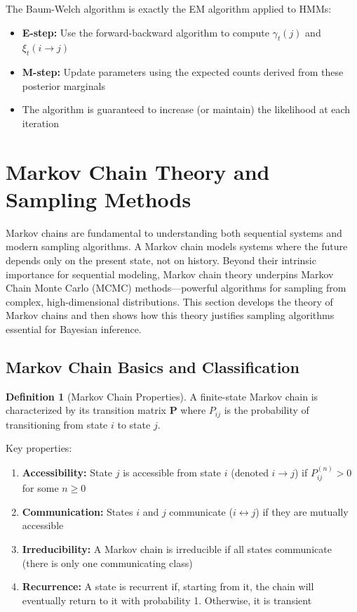 \documentclass[12pt,a4paper]{article}
\theoremstyle{definition}
\newtheorem{definition}{Definition}[section]
\begin{document}
The Baum-Welch algorithm is exactly the EM algorithm applied to HMMs:
\begin{itemize}
    \item \textbf{E-step:} Use the forward-backward algorithm to compute $\gamma_t(j)$ and $\xi_t(i \to j)$
    \item \textbf{M-step:} Update parameters using the expected counts derived from these posterior marginals
    \item The algorithm is guaranteed to increase (or maintain) the likelihood at each iteration
\end{itemize}

\newpage


\section{Markov Chain Theory and Sampling Methods}

Markov chains are fundamental to understanding both sequential systems and modern sampling algorithms. A Markov chain models systems where the future depends only on the present state, not on history. Beyond their intrinsic importance for sequential modeling, Markov chain theory underpins Markov Chain Monte Carlo (MCMC) methods—powerful algorithms for sampling from complex, high-dimensional distributions. This section develops the theory of Markov chains and then shows how this theory justifies sampling algorithms essential for Bayesian inference.

\subsection{Markov Chain Basics and Classification}

\begin{definition}[Markov Chain Properties]
A finite-state Markov chain is characterized by its transition matrix $\mathbf{P}$ where $P_{ij}$ is the probability of transitioning from state $i$ to state $j$.

Key properties:
\begin{enumerate}
    \item \textbf{Accessibility:} State $j$ is accessible from state $i$ (denoted $i \to j$) if $P_{ij}^{(n)} > 0$ for some $n \geq 0$
    
    \item \textbf{Communication:} States $i$ and $j$ communicate ($i \leftrightarrow j$) if they are mutually accessible
    
    \item \textbf{Irreducibility:} A Markov chain is irreducible if all states communicate (there is only one communicating class)
    
    \item \textbf{Recurrence:} A state is recurrent if, starting from it, the chain will eventually return to it with probability 1. Otherwise, it is transient
\end{enumerate}
\end{definition}
\end{document}
